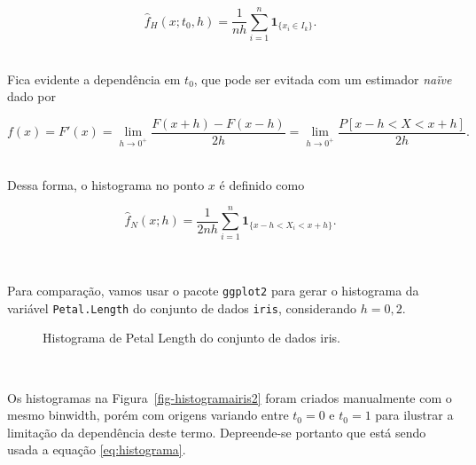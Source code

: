 \documentclass[
  a4paperpaper,
]{article}
\begin{document}
\[
\hat{f}_H(x; t_0, h) = \frac{1}{nh} \sum_{i=1}^n \mathbf{1}_{ \{x_i \in I_k \} }.
\] ~

Fica evidente a dependência em \(t_0\), que pode ser evitada com um
estimador \emph{naïve} dado por

\[
f(x) = F'(x) = \lim_{h\to 0^+} \frac{F(x+h) - F(x-h)}{2h} = \lim_{h\to 0^+} \frac{P[x-h < X < x+h]}{2h}.
\] ~

\noindent Dessa forma, o histograma no ponto \(x\) é definido como

\[
\hat{f}_N(x;h) = \frac{1}{2nh} \sum_{i=1}^n \mathbf{1}_{ \{ x-h < X_i < x+h \} }.
\]

~

Para comparação, vamos usar o pacote \texttt{ggplot2} para gerar o
histograma da variável \texttt{Petal.Length} do conjunto de dados
\texttt{iris}, considerando \(h = 0,2\).

\begin{figure}[H]


\caption{\label{fig-histogramairis}Histograma de Petal Length do
conjunto de dados iris.}

\end{figure}%

~

Os histogramas na Figura~\ref{fig-histogramairis2} foram criados
manualmente com o mesmo binwidth, porém com origens variando entre
\(t_0 = 0\) e \(t_0 = 1\) para ilustrar a limitação da dependência deste
termo. Depreende-se portanto que está sendo usada a equação
\ref{eq:histograma}.

~
\end{document}
